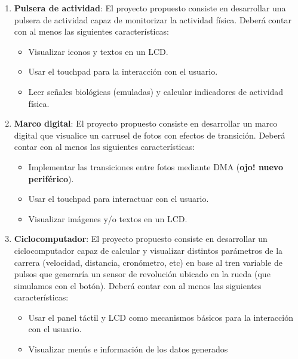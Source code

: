\documentclass[../main.tex]{subfiles}
\begin{document}
        \begin{enumerate}
            \item \textbf{Pulsera de actividad}: El proyecto propuesto consiste en desarrollar una pulsera de actividad capaz de monitorizar la actividad física. Deberá contar con al menos las siguientes características:
                \begin{itemize}
                    \item Visualizar iconos y textos en un LCD.
                    \item Usar el touchpad para la interacción con el usuario.
                    \item Leer señales biológicas (emuladas) y calcular indicadores de actividad física.
                \end{itemize}

            \item \textbf{Marco digital}: El proyecto propuesto consiste en desarrollar un marco digital que visualice un carrusel de fotos con efectos de transición. Deberá contar con al menos las siguientes características:
                \begin{itemize}
                    \item Implementar las transiciones entre fotos mediante DMA (\textbf{ojo! nuevo periférico}).
                    \item Usar el touchpad para interactuar con el usuario.
                    \item Visualizar imágenes y/o textos en un LCD.
                \end{itemize}

            \item \textbf{Ciclocomputador}: El proyecto propuesto consiste en desarrollar un ciclocomputador capaz de calcular y visualizar distintos parámetros de la carrera (velocidad, distancia, cronómetro, etc) en base al tren variable de pulsos que generaría un sensor de revolución ubicado en la rueda (que simulamos con el botón). Deberá contar con al menos las siguientes características:

                \begin{itemize}
                    \item Usar el panel táctil y LCD como mecanismos básicos para la interacción con el usuario.
                    \item Visualizar menús e información de los datos generados
                \end{itemize}


\end{enumerate}
\end{document}
